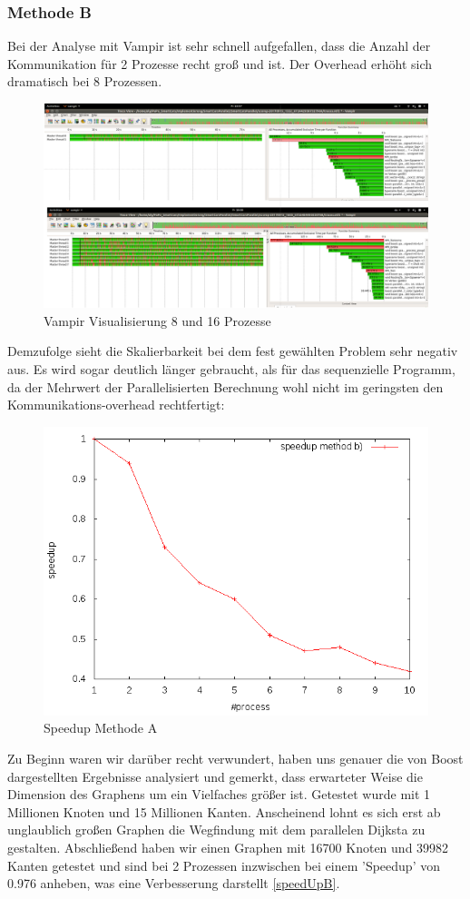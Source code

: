 \documentclass[paper=A4,pagesize=auto,12pt,headinclude=true,footinclude=true,BCOR=0mm,DIV=calc]{scrartcl}
\begin{document}
	\subsubsection{Methode B}
	Bei der Analyse mit Vampir ist sehr schnell aufgefallen, dass die Anzahl der Kommunikation für 2 Prozesse recht groß und ist. Der Overhead erhöht sich dramatisch bei 8 Prozessen.
		\label{vampirB}
		\begin{figure}[H]
			\includegraphics[scale = 0.38]{Prasentation/vampirmethodB.png}
			\caption{Vampir Visualisierung 8 und 16 Prozesse}
		\end{figure}
	Demzufolge sieht die Skalierbarkeit bei dem fest gewählten Problem sehr negativ aus. Es wird sogar deutlich länger gebraucht, als für das sequenzielle Programm, da der Mehrwert der Parallelisierten Berechnung wohl nicht im geringsten den Kommunikations-overhead rechtfertigt:
	\label{speedUpB}
	\begin{figure}[H]
		\includegraphics[scale = 0.55]{Prasentation/speedupPBoost.png}
		\caption{Speedup Methode A}
	\end{figure}
	Zu Beginn waren wir darüber recht verwundert, haben uns genauer die von Boost dargestellten Ergebnisse analysiert und gemerkt, dass erwarteter Weise die Dimension des Graphens um ein Vielfaches größer ist. Getestet wurde mit 1 Millionen Knoten und 15 Millionen Kanten\cite{DijkstraBoost}. Anscheinend lohnt es sich erst ab unglaublich großen Graphen die Wegfindung mit dem parallelen Dijksta zu gestalten. Abschließend haben wir einen Graphen mit 16700 Knoten und 39982 Kanten getestet und sind bei 2 Prozessen inzwischen bei einem 'Speedup' von 0.976 anheben, was eine Verbesserung darstellt \ref{speedUpB}.
\end{document}
